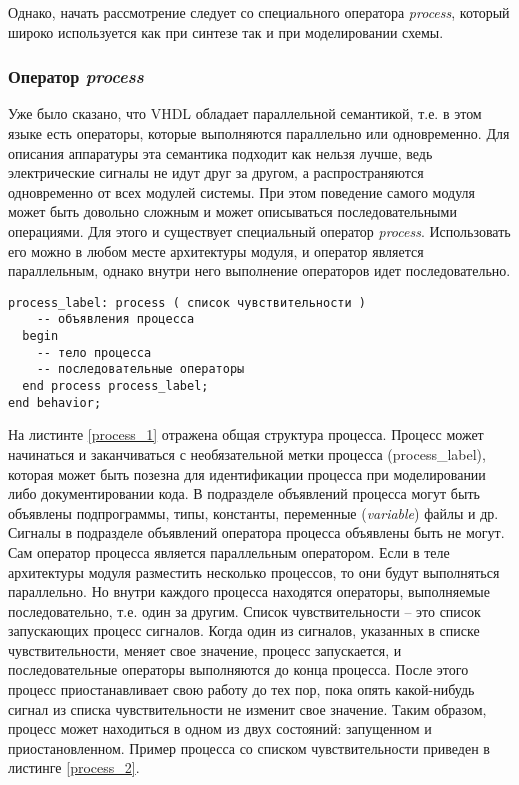 Однако, начать рассмотрение следует со специального оператора \emph{process}, который широко используется как при синтезе так и при моделировании схемы.

\subsubsection{Оператор \emph{process}}

Уже было сказано, что VHDL обладает параллельной семантикой, т.е. в этом языке есть операторы, которые выполняются параллельно или одновременно. Для описания аппаратуры эта семантика подходит как нельзя лучше, ведь электрические сигналы не идут друг за другом, а распространяются одновременно от всех модулей системы. При этом поведение самого модуля может быть довольно сложным и может описываться последовательными операциями. Для этого и существует специальный оператор \emph{process}. Использовать его можно в любом месте архитектуры модуля, и оператор является параллельным, однако внутри него выполнение операторов идет последовательно.


\begin{Code}
\begin{lstlisting}[caption=Оператор \emph{process},label=process_1]
  process_label: process ( список чувствительности )
    -- объявления процесса
  begin
    -- тело процесса
    -- последовательные операторы
  end process process_label;
end behavior;
\end{lstlisting}
\end{Code}

На листинте \ref{process_1} отражена общая структура процесса. Процесс может начинаться и заканчиваться с необязательной метки процесса (process\_label), которая может быть позезна для идентификации процесса при моделировании либо документировании кода. В подразделе объявлений  процесса могут быть объявлены подпрограммы, типы,  константы, переменные (\emph{variable}) файлы и др. Сигналы в подразделе объявлений оператора процесса объявлены быть не могут. Сам оператор процесса является параллельным оператором. Если в  теле архитектуры модуля разместить несколько процессов, то они будут выполняться параллельно. Но внутри каждого процесса находятся операторы, выполняемые последовательно, т.е. один за другим. Список чувствительности – это список запускающих процесс сигналов. Когда один из сигналов, указанных в списке чувствительности, меняет свое значение, процесс запускается, и последовательные операторы выполняются до конца процесса. После этого процесс приостанавливает свою работу до тех пор, пока опять какой-нибудь сигнал из списка чувствительности не изменит свое значение. Таким образом, процесс может находиться в одном из двух состояний: запущенном и приостановленном.
Пример процесса со списком чувствительности приведен в листинге \ref{process_2}.

